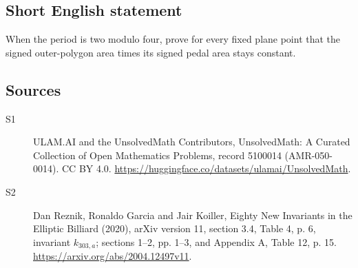 \documentclass[11pt]{article}
\begin{document}
\subsection{Short English statement}
When the period is two modulo four, prove for every fixed plane point that the signed outer-polygon area times its signed pedal area stays constant.
\subsection{Sources}
\begin{description}
\item[\hypertarget{source:5100014:1}{S1}] ULAM.AI and the UnsolvedMath Contributors, UnsolvedMath: A Curated Collection of Open Mathematics Problems, record 5100014 (AMR-050-0014). CC BY 4.0. \url{https://huggingface.co/datasets/ulamai/UnsolvedMath}.
\item[\hypertarget{source:5100014:2}{S2}] Dan Reznik, Ronaldo Garcia and Jair Koiller, Eighty New Invariants in the Elliptic Billiard (2020), arXiv version 11, section 3.4, Table 4, p. 6, invariant $k_{303,a}$; sections 1--2, pp. 1--3, and Appendix A, Table 12, p. 15. \url{https://arxiv.org/abs/2004.12497v11}.
\end{description}
\label{end:5100014}
\end{document}
